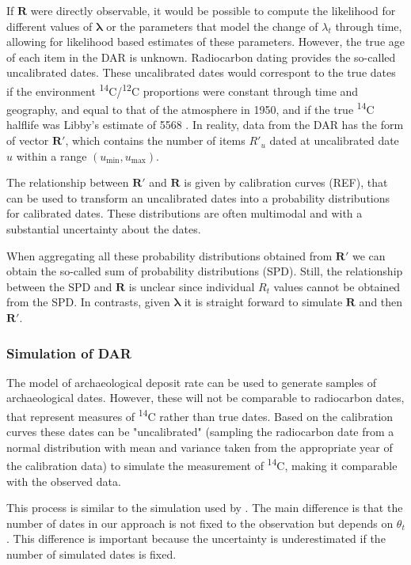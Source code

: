 \documentclass[a4paper]{article}
\begin{document}
If $\bm{R}$ were directly observable, it would be possible to compute the likelihood for different values of $\bm{\lambda}$ or the parameters that model the change of $\lambda_t$ through time, allowing for likelihood based estimates of these parameters. However, the true age of each item in the DAR is unknown. Radiocarbon dating provides the so-called uncalibrated dates. These uncalibrated dates would correspont to the true dates if the environment \textsuperscript{14}C/\textsuperscript{12}C proportions were constant through time and geography, and equal to that of the atmosphere in 1950, and if the true \textsuperscript{14}C halflife was Libby's estimate of 5568 \parencite{BronkRamsey2008}. In reality, data from the DAR has the form of vector $\bm{R'}$, which contains the number of items $R'_u$ dated at uncalibrated date $u$ within a range $(u_{\mathrm{min}},u_{\mathrm{max}})$.

The relationship between $\bm{R'}$ and $\bm{R}$ is given by calibration curves (REF), that can be used to transform an uncalibrated dates into a probability distributions for calibrated dates. These distributions are often multimodal and with a substantial uncertainty about the dates.

When aggregating all these probability distributions obtained from $\bm{R'}$ we can obtain the so-called sum of probability distributions (SPD). Still, the relationship between the SPD and $\bm{R}$ is unclear since individual $R_t$ values cannot be obtained from the SPD. In contrasts, given $\bm\lambda$ it is straight forward to simulate $\bm{R}$ and then $\bm{R'}$. 

\subsubsection*{Simulation of DAR}

The model of archaeological deposit rate can be used to generate samples of archaeological dates. However, these will not be comparable to radiocarbon dates, that represent measures of \textsuperscript{14}C rather than true dates. Based on the calibration curves these dates can be "uncalibrated" (sampling the radiocarbon date from a normal distribution with mean and variance taken from the appropriate year of the calibration data) to simulate the measurement of \textsuperscript{14}C, making it comparable with the observed data.




This process is similar to the simulation used by \textcite{Shennan2013}. The main difference is that the number of dates in our approach is not fixed to the observation but depends on $\theta_t$. This difference is important because the uncertainty is underestimated if the number of simulated dates is fixed.
\end{document}
